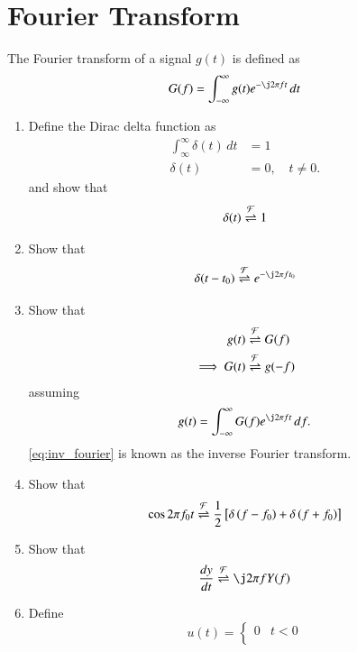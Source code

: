\documentclass[journal,12pt,twocolumn]{IEEEtran}
\begin{document}
\section{Fourier Transform}
The Fourier transform of a signal $g(t)$ is defined as
\begin{equation}
\label{eq:fourier}
G(f) = \int_{-\infty}^{\infty}g(t)e^{-\j 2\pi f t}\,dt
\end{equation}
\begin{enumerate}[1.]
\item Define the Dirac delta function as
\begin{equation}
\begin{split}
\int_{\infty}^{\infty} \delta(t)\,dt &= 1
\\
\delta(t) &= 0, \quad t \neq 0.
\end{split}
\end{equation}
and show that
\begin{equation}
\delta (t) \overset{\mathcal{F}}{ \rightleftharpoons} 1
\end{equation}
\item Show that 
\begin{equation}
\delta (t-t_0) \fourier e^{-\j2\pi f t_0}
\end{equation}
\item  Show that 
\begin{equation}
\label{eq:duality}
\begin{split}
g(t) & \overset{\mathcal{F}}{ \rightleftharpoons} G(f)
\\
\implies G(t) & \overset{\mathcal{F}}{ \rightleftharpoons} g(-f)
\end{split}
\end{equation}
assuming
\begin{equation}
\label{eq:inv_fourier}
g(t) = \int_{-\infty}^{\infty}G(f)e^{\j 2\pi f t}\,df.
\end{equation}
\eqref{eq:inv_fourier} is known as the inverse Fourier transform.
\item Show that
\begin{equation}
\cos2\pi f_0 t \overset{\mathcal{F}}{ \rightleftharpoons} \frac{1}{2}{}\left[\delta\left(f-f_0\right)+\delta \left(f+f_0\right)\right]
\end{equation}
\item Show that
\begin{equation}
\frac{dy}{dt} \fourier \j 2 \pi f Y(f)
\end{equation}
\item Define
\begin{equation}
u(t) =
\begin{cases}
0 & t < 0
\\

\end{cases}
\end{equation}
\end{enumerate}
\end{document}
